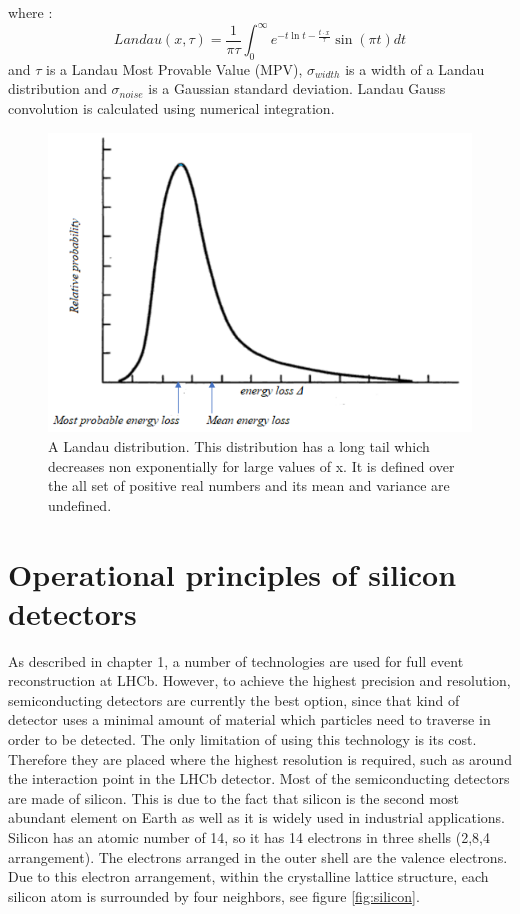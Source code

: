 where :
\begin{equation}
    Landau(x,\tau) =  \frac{1}{\pi \tau} \int_{0}^{\infty} e^{-t \ln t - \frac{t \cdot x}{\tau}} \sin{\left(\pi t\right)} dt
\end{equation}
and $\tau$ is a Landau Most Provable Value (MPV), $\sigma_{width}$ is a width of a Landau distribution and $\sigma_{noise}$ is a Gaussian standard deviation. Landau Gauss convolution is calculated using numerical integration. 


\begin{figure}[h]
\centering
\includegraphics{figures/landau-distribution.png}
\caption{A Landau distribution. This distribution has a long tail which decreases  non exponentially for large values of x. It is defined over the all set of positive real numbers and its mean and variance are undefined.  
\label{fig:landau_distribution}}
\end{figure}

\section{Operational principles of silicon detectors}

As described in chapter 1, a number of technologies are used for full event reconstruction at LHCb.  However, to achieve the highest precision and resolution, semiconducting detectors are currently the best option, since that kind of detector uses a minimal amount of material which particles need to traverse in order to be detected.  The only limitation of using this technology is its cost. Therefore they are placed where the highest resolution is required, such as around the interaction point in the LHCb detector. 
Most of the semiconducting detectors are made of silicon.  This is due to the fact that silicon is the second most abundant element on Earth as well as it is widely used in industrial applications. Silicon has an atomic number of 14, so it has 14 electrons in three shells (2,8,4 arrangement). The electrons arranged in the outer shell are the valence electrons.  Due to this electron arrangement, within the crystalline lattice structure, each silicon atom is surrounded by four neighbors, see figure \ref{fig:silicon}.  

